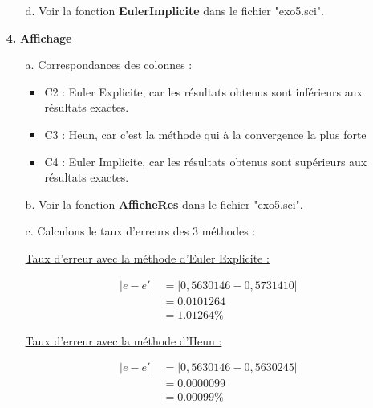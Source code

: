 \documentclass[12pt, letterpaper]{article}
\begin{document}
\begin{enumerate}
\begin{enumerate}
\item[d.] Voir la fonction \textbf{EulerImplicite} dans le fichier "exo5.sci".
  
\end{enumerate}

\item[\textbf{4.}] \textbf{Affichage}

\begin{enumerate}
\item[a.] Correspondances des colonnes :

  \begin{itemize}
  \item C2 : Euler Explicite, car les résultats obtenus sont
    inférieurs aux résultats exactes.
  \item C3 : Heun, car c'est la méthode qui à la convergence la plus forte
  \item C4 : Euler Implicite, car les résultats obtenus sont
    supérieurs aux résultats exactes.
  \end{itemize}

\item[b.] Voir la fonction \textbf{AfficheRes} dans le fichier
  "exo5.sci".

\item[c.] Calculons le taux d'erreurs des 3 méthodes :

  \underline{Taux d'erreur avec la méthode d'Euler Explicite :}

  \begin{equation*}
    \begin{split}
      \left\lvert e - e' \right\rvert & = \left\lvert 0,5630146 - 0,5731410
        \right\rvert \\
        & = 0.0101264 \\
        & = 1.01264 \%
    \end{split}
  \end{equation*}

  \underline{Taux d'erreur avec la méthode d'Heun :}

  \begin{equation*}
    \begin{split}
      \left\lvert e - e' \right\rvert & = \left\lvert 0,5630146 - 0,5630245
        \right\rvert \\
        & = 0.0000099 \\
        & = 0.00099 \%
    \end{split}
  \end{equation*}


\end{enumerate}
\end{enumerate}
\end{document}
